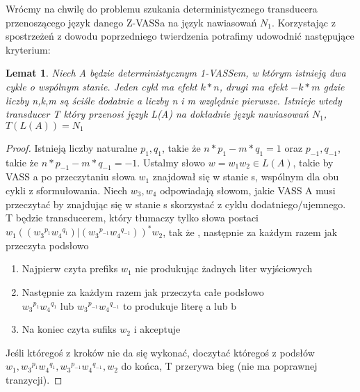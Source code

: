 \documentclass[magisterska]{pracamgr}
\newtheorem{lemma}[theorem]{Lemat}
\newtheorem{proof}[theorem]{Dowód}
\begin{document}
    Wrócmy na chwilę do problemu szukania deterministycznego transducera przenoszącego język danego Z-VASSa na język nawiasowań $N_1$.
    Korzystając z spostrzeżeń z dowodu poprzedniego twierdzenia potrafimy udowodnić następujące kryterium:
    \begin{lemma}
        Niech A będzie deterministycznym 1-VASSem, w którym istnieją dwa cykle o wspólnym stanie.
        Jeden cykl ma efekt $k*n$, drugi ma efekt  $-k*m$ gdzie liczby n,k,m są ściśle dodatnie a liczby n i m względnie pierwsze.
        Istnieje wtedy transducer T który przenosi język L(A) na dokładnie język nawiasowań $N_1$, $T(L(A)) = N_1$
    \end{lemma}
    \begin{proof}
        Istnieją liczby naturalne  $p_1,q_1$, takie że  $n*p_1 - m*q_1 = 1$ oraz $p_{-1},q_{-1}$, takie że  $n*p_{-1} - m*q_{-1} = -1$.
        Ustalmy słowo $w=w_1 w_2 \in L(A)$, takie by VASS a po przeczytaniu słowa $w_1$ znajdował się w stanie s, wspólnym dla obu cykli
        z sformułowania.
        Niech $w_3,w_4$ odpowiadają słowom, jakie VASS A musi przeczytać by znajdując się w stanie s skorzystać z cyklu dodatniego/ujemnego.
        T będzie transducerem, który tłumaczy tylko słowa postaci $w_1 (({w_3}^{p_1} {w_4}^{q_1}) | ({w_3}^{p_{-1}} {w_4}^{q_{-1}}))^* w_2$,
        tak że , następnie za każdym razem jak przeczyta podsłowo
        \begin{enumerate}
            \item Najpierw czyta prefiks $w_1$ nie produkując żadnych liter wyjściowych
            \item Następnie za każdym razem jak przeczyta całe podsłowo ${w_3}^{p_1} {w_4}^{q_1} \text{ lub }  {w_3}^{p_{-1}} {w_4}^{q_{-1}}$ to produkuje literę a lub b
            \item Na koniec czyta sufiks $w_2$ i akceptuje
        \end{enumerate}
        Jeśli któregoś z kroków nie da się wykonać, doczytać któregoś z podsłów $w_1,{w_3}^{p_1} {w_4}^{q_1},{w_3}^{p_{-1}} {w_4}^{q_{-1}},w_2$ do końca, T przerywa bieg (nie ma poprawnej tranzycji).


    \end{proof}

%
%
\end{document}
